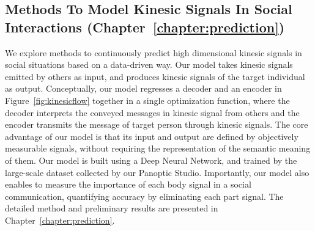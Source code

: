 \subsection{Methods To Model Kinesic Signals In Social Interactions (Chapter~\ref{chapter:prediction})  }
 We explore methods to continuously predict high dimensional kinesic signals in social situations based on a data-driven way. Our model takes kinesic signals emitted by others as input, and produces kinesic signals of the target individual as output. Conceptually, our model regresses a decoder and an encoder in Figure~\ref{fig:kinesicflow} together in a single optimization function, where the decoder interprets the conveyed messages in kinesic signal from others and the encoder transmits the message of target person through kinesic signals. The core advantage of our model is that its input and output are defined by objectively measurable signals, without requiring the representation of the semantic meaning of them. Our model is built using a Deep Neural Network, and trained by the large-scale dataset collected by our Panoptic Studio. Importantly, our model also enables to measure the importance of each body signal in a social communication, quantifying accuracy by eliminating each part signal. The detailed method and preliminary results are presented in Chapter~\ref{chapter:prediction}.




